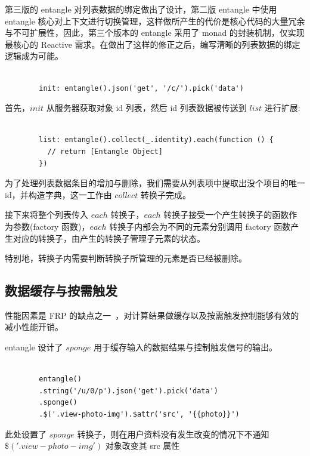 第三版的 entangle 对列表数据的绑定做出了设计，第二版 entangle 中使用 entangle 核心对上下文进行切换管理，这样做所产生的代价是核心代码的大量冗余与不可扩展性，因此，第三个版本的 entangle 采用了 monad 的封装机制，仅实现最核心的 Reactive 需求。在做出了这样的修正之后，编写清晰的列表数据的绑定逻辑成为可能。

\begin{verbatim}

        init: entangle().json('get', '/c/').pick('data')

\end{verbatim}

首先，$init$ 从服务器获取对象 id 列表，然后 id 列表数据被传送到 $list$ 进行扩展:

\begin{verbatim}

        list: entangle().collect(_.identity).each(function () {
          // return [Entangle Object]
        })

\end{verbatim}

为了处理列表数据条目的增加与删除，我们需要从列表项中提取出没个项目的唯一 id，并构造字典，这一工作由 $collect$ 转换子完成。

接下来将整个列表传入 $each$ 转换子，$each$ 转换子接受一个产生转换子的函数作为参数(factory 函数)，$each$ 转换子内部会为不同的元素分别调用 factory 函数产生对应的转换子，由产生的转换子管理子元素的状态。

特别地，转换子内需要判断转换子所管理的元素是否已经被删除。

\subsection{数据缓存与按需触发}

性能因素是 FRP 的缺点之一~\cite{Elliott:2009:PFR:1596638.1596643}，对计算结果做缓存以及按需触发控制能够有效的减小性能开销。

entangle 设计了 $sponge$ 用于缓存输入的数据结果与控制触发信号的输出。

\begin{verbatim}

        entangle()
        .string('/u/0/p').json('get').pick('data')
        .sponge()
        .$('.view-photo-img').$attr('src', '{{photo}}')

\end{verbatim}

此处设置了 $sponge$ 转换子，则在用户资料没有发生改变的情况下不通知 $\$('.view-photo-img')$ 对象改变其 src 属性

